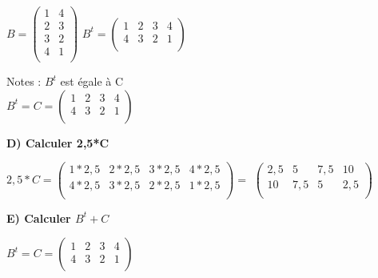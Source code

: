 \vspace{5mm} %
$
B =
\begin{pmatrix}
  1 & 4 \\
  2 & 3 \\
  3 & 2 \\
  4 & 1 \\
\end{pmatrix}
$
\vspace{5mm} %
$
B^{t} =
\begin{pmatrix}
  1 & 2 & 3 & 4 \\
  4 & 3 & 2 & 1 \\
\end{pmatrix}
$

Notes : $B^{t}$ est égale à C \\

$
B^{t} = C =
\begin{pmatrix}
  1 & 2 & 3 & 4 \\
  4 & 3 & 2 & 1 \\
\end{pmatrix}
$

\vspace{6mm} %
\textbf{D) Calculer 2,5*C} \\
\vspace{5mm} %

$
2,5*C =
\begin{pmatrix}
  1*2,5 & 2*2,5 & 3*2,5 & 4*2,5 \\
  4*2,5 & 3*2,5 & 2*2,5 & 1*2,5 \\
\end{pmatrix}
=
$
\vspace{5mm} %
$
\begin{pmatrix}
  2,5 & 5 & 7,5 & 10 \\
  10 & 7,5 & 5 & 2,5 \\
\end{pmatrix}
$

\vspace{2mm} %
\textbf{E) Calculer $B^{t} + C$} \\
\vspace{2mm} %

$
B^{t} = C =
\begin{pmatrix}
  1 & 2 & 3 & 4 \\
  4 & 3 & 2 & 1 \\
\end{pmatrix}
$
\vspace{5mm} %

